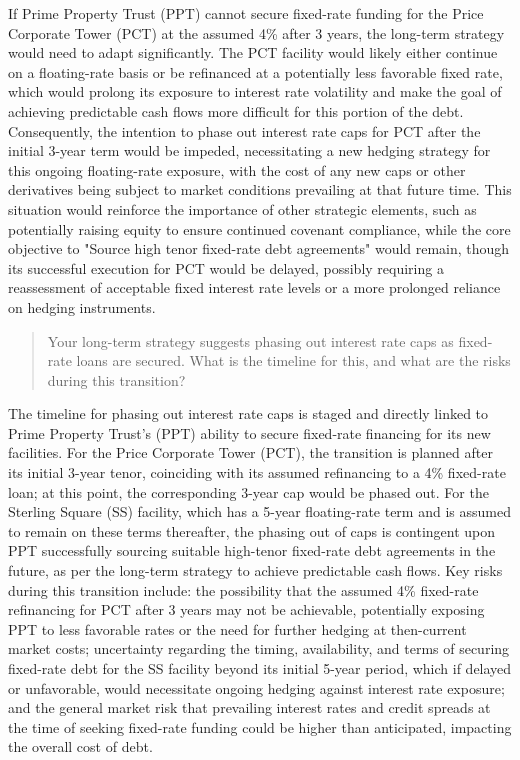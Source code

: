 \documentclass[11pt, a4paper, british]{article}
\begin{document}
If Prime Property Trust (PPT) cannot secure fixed-rate funding for the Price Corporate Tower (PCT) at the assumed 4\% after 3 years, the long-term strategy would need to adapt significantly. The PCT facility would likely either continue on a floating-rate basis or be refinanced at a potentially less favorable fixed rate, which would prolong its exposure to interest rate volatility and make the goal of achieving predictable cash flows more difficult for this portion of the debt. Consequently, the intention to phase out interest rate caps for PCT after the initial 3-year term would be impeded, necessitating a new hedging strategy for this ongoing floating-rate exposure, with the cost of any new caps or other derivatives being subject to market conditions prevailing at that future time. This situation would reinforce the importance of other strategic elements, such as potentially raising equity to ensure continued covenant compliance, while the core objective to "Source high tenor fixed-rate debt agreements"  would remain, though its successful execution for PCT would be delayed, possibly requiring a reassessment of acceptable fixed interest rate levels or a more prolonged reliance on hedging instruments.

\newpage

\begin{quote}
    Your long-term strategy suggests phasing out interest rate caps as fixed-rate loans are secured. What is the timeline for this, and what are the risks during this transition?
\end{quote}

The timeline for phasing out interest rate caps is staged and directly linked to Prime Property Trust's (PPT) ability to secure fixed-rate financing for its new facilities. For the Price Corporate Tower (PCT), the transition is planned after its initial 3-year tenor, coinciding with its assumed refinancing to a 4\% fixed-rate loan; at this point, the corresponding 3-year cap would be phased out. For the Sterling Square (SS) facility, which has a 5-year floating-rate term and is assumed to remain on these terms thereafter, the phasing out of caps is contingent upon PPT successfully sourcing suitable high-tenor fixed-rate debt agreements in the future, as per the long-term strategy to achieve predictable cash flows. Key risks during this transition include: the possibility that the assumed 4\% fixed-rate refinancing for PCT after 3 years may not be achievable, potentially exposing PPT to less favorable rates or the need for further hedging at then-current market costs; uncertainty regarding the timing, availability, and terms of securing fixed-rate debt for the SS facility beyond its initial 5-year period, which if delayed or unfavorable, would necessitate ongoing hedging against interest rate exposure; and the general market risk that prevailing interest rates and credit spreads at the time of seeking fixed-rate funding could be higher than anticipated, impacting the overall cost of debt.
\end{document}
